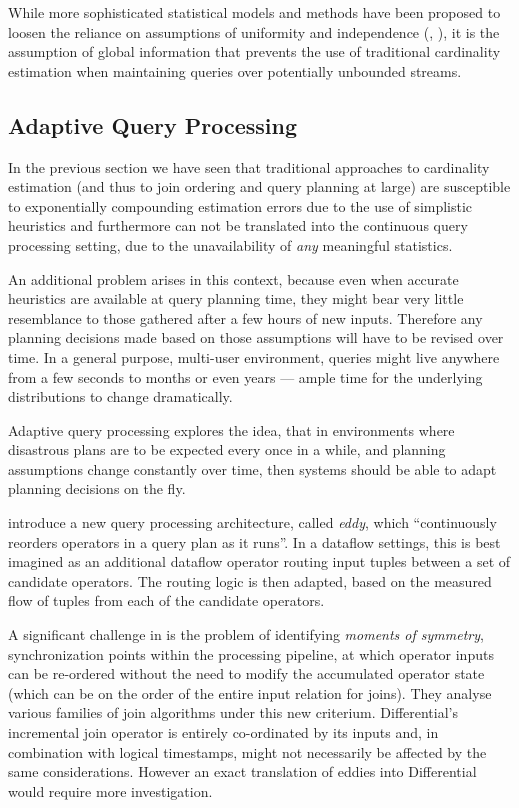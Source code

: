 \documentclass[../index.tex]{subfiles}
\begin{document}
While more sophisticated statistical models and methods have been
proposed to loosen the reliance on assumptions of uniformity and
independence (\cite{markl2007consistent}, \cite{ilyas2004cords}), it
is the assumption of global information that prevents the use of
traditional cardinality estimation when maintaining queries over
potentially unbounded streams.

\subsection{Adaptive Query Processing} \label{technique-adaptive}

In the previous section we have seen that traditional approaches to
cardinality estimation (and thus to join ordering and query planning
at large) are susceptible to exponentially compounding estimation
errors due to the use of simplistic heuristics and furthermore can not
be translated into the continuous query processing setting, due to the
unavailability of \emph{any} meaningful statistics.

An additional problem arises in this context, because even when
accurate heuristics are available at query planning time, they might
bear very little resemblance to those gathered after a few hours of
new inputs. Therefore any planning decisions made based on those
assumptions will have to be revised over time. In a general purpose,
multi-user environment, queries might live anywhere from a few seconds
to months or even years — ample time for the underlying distributions
to change dramatically.

Adaptive query processing explores the idea, that in environments
where disastrous plans are to be expected every once in a while, and
planning assumptions change constantly over time, then systems should
be able to adapt planning decisions on the fly.

\cite{avnur2000eddies} introduce a new query processing architecture,
called \emph{eddy}, which ``continuously reorders operators in a query
plan as it runs''. In a dataflow settings, this is best imagined as an
additional dataflow operator routing input tuples between a set of
candidate operators. The routing logic is then adapted, based on the
measured flow of tuples from each of the candidate operators.

A significant challenge in \cite{avnur2000eddies} is the problem of
identifying \emph{moments of symmetry}, synchronization points within
the processing pipeline, at which operator inputs can be re-ordered
without the need to modify the accumulated operator state (which can
be on the order of the entire input relation for joins). They analyse
various families of join algorithms under this new
criterium. Differential's incremental join operator is entirely
co-ordinated by its inputs and, in combination with logical
timestamps, might not necessarily be affected by the same
considerations. However an exact translation of eddies into
Differential would require more investigation.
\end{document}
